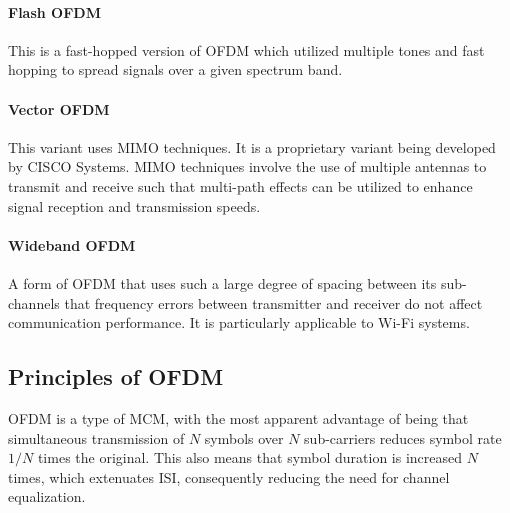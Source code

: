 \paragraph{Flash OFDM} This is a fast-hopped version of OFDM which utilized multiple tones and fast hopping to spread signals over a given spectrum band.
\paragraph{Vector OFDM} This variant uses \gls{MIMO} techniques. It is a proprietary variant being developed by CISCO Systems. \gls{MIMO} techniques involve the use of multiple antennas to transmit and receive such that multi-path effects can be utilized to enhance signal reception and transmission speeds.
\paragraph{Wideband OFDM} A form of OFDM that uses such a large degree of spacing between its sub-channels that frequency errors between transmitter and receiver do not affect communication performance. It is particularly applicable to Wi-Fi systems.

\subsection{Principles of OFDM}
\gls{OFDM} is a type of \gls{MCM}, with the most apparent advantage of being that simultaneous transmission of \(N\) symbols over \(N\) sub-carriers reduces symbol rate \(1/N\) times the original. This also means that symbol duration is increased \(N\) times, which extenuates \gls{ISI}, consequently reducing the need for channel equalization.

